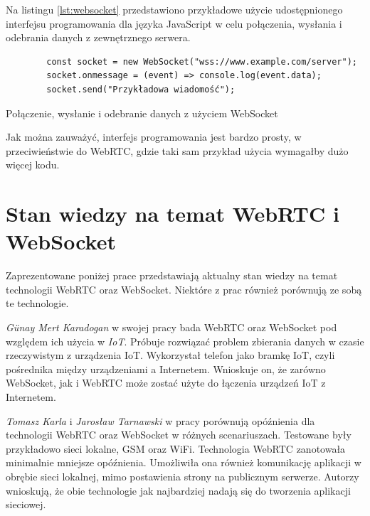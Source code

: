\documentclass[language=polish,type=master]{aghmodern}
\begin{document}
Na listingu \ref{lst:websocket} przedstawiono przykładowe użycie udostępnionego interfejsu programowania dla języka JavaScript w celu połączenia, wysłania i odebrania danych z zewnętrznego serwera.

\begin{listing}[H]
    \begin{verbatim}
        const socket = new WebSocket("wss://www.example.com/server");
        socket.onmessage = (event) => console.log(event.data);
        socket.send("Przykładowa wiadomość");
    \end{verbatim}
    \caption{Połączenie, wysłanie i odebranie danych z użyciem WebSocket}
    \label{lst:websocket}
\end{listing}

Jak można zauważyć, interfejs programowania jest bardzo prosty, w przeciwieństwie do WebRTC, gdzie taki sam przykład użycia wymagałby dużo więcej kodu.

\pagebreak

\section{Stan wiedzy na temat WebRTC i WebSocket}
Zaprezentowane poniżej prace przedstawiają aktualny stan wiedzy na temat technologii WebRTC oraz WebSocket.
Niektóre z prac również porównują ze sobą te technologie.

\emph{G{\"u}nay Mert Karadogan} w swojej pracy \cite{websocket_webrtc_iot} bada WebRTC oraz WebSocket pod względem ich użycia w \emph{IoT}\footnotemark{}.
Próbuje rozwiązać problem zbierania danych w czasie rzeczywistym z urządzenia IoT.
Wykorzystał telefon jako bramkę IoT, czyli pośrednika między urządzeniami a Internetem.
Wnioskuje on, że zarówno WebSocket, jak i WebRTC może zostać użyte do łączenia urządzeń IoT z Internetem.

\emph{Tomasz Karla} i \emph{Jarosław Tarnawski} w pracy \cite{websocket_webrtc_realtime} porównują opóźnienia dla technologii WebRTC oraz WebSocket w różnych scenariuszach.
Testowane były przykładowo sieci lokalne, GSM oraz WiFi. Technologia WebRTC zanotowała minimalnie mniejsze opóźnienia.
Umożliwiła ona również komunikację aplikacji w obrębie sieci lokalnej\footnotemark{}, mimo postawienia strony na publicznym serwerze.
Autorzy wnioskują, że obie technologie jak najbardziej nadają się do tworzenia aplikacji sieciowej.
\end{document}
